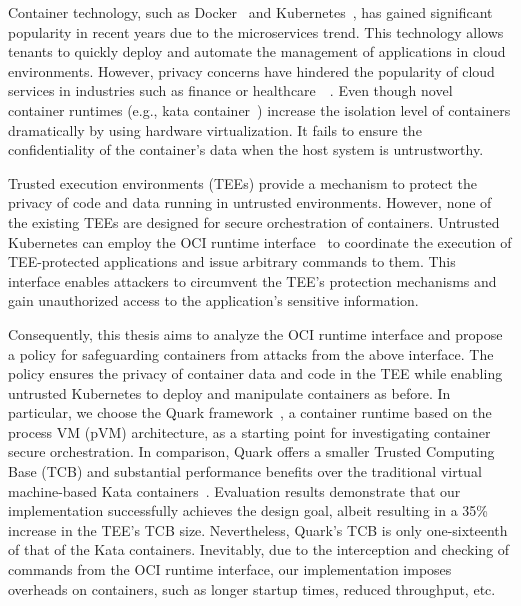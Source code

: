 




Container technology, such as Docker~\cite*{docker} and Kubernetes~\cite*{k8s}, has gained significant popularity in recent years due to the microservices trend. This technology allows tenants to quickly deploy and automate the management of applications in cloud environments. However, privacy concerns 
have hindered the popularity of cloud services in industries such as finance or healthcare~\cite*{data_privacy}~\cite*{eu_data_Privacy}. Even though novel container runtimes (e.g., kata container~\cite*{Kata-Containers}) increase the isolation level of containers dramatically by using hardware virtualization. 
It fails to ensure the confidentiality of the container's data when the host system is untrustworthy.

Trusted execution environments (TEEs) provide a mechanism to protect the privacy of code and data running in untrusted environments. However, none of the existing TEEs are designed for secure orchestration of containers. Untrusted Kubernetes can employ the OCI runtime interface~\cite*{oci-runtime-spec} to coordinate the execution of 
TEE-protected applications and issue arbitrary commands to them. This interface enables attackers to circumvent the TEE's protection mechanisms and gain unauthorized access to the application's sensitive information.

Consequently, this thesis aims to analyze the OCI runtime interface and propose a policy for safeguarding containers from attacks from the above interface. The policy ensures the privacy of container data and code in the TEE while enabling untrusted Kubernetes to deploy and manipulate containers as 
before. In particular, we choose the Quark framework~\cite*{quark}, a container runtime based on the process VM (pVM) architecture, as a starting point for investigating container secure orchestration. In comparison, Quark offers a smaller Trusted Computing Base (TCB) and substantial performance 
benefits over the traditional virtual machine-based Kata containers~\cite*{quark_performance_report}. Evaluation results demonstrate that our implementation successfully achieves the design goal, albeit resulting in a 35\% increase in the TEE's TCB size. Nevertheless, Quark's TCB is only 
one-sixteenth of that of the Kata containers. Inevitably, due to the interception and checking of commands from the OCI runtime interface, our implementation imposes overheads on containers, such as longer startup times, reduced throughput, etc.



